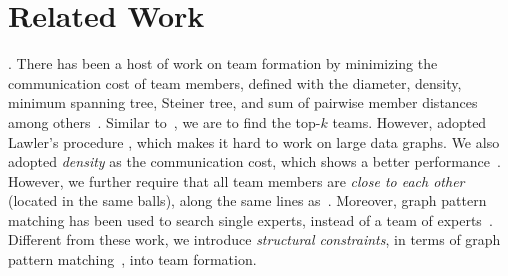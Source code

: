 \section{Related Work}
\label{sec-related}



. There has been a host of work on team formation by minimizing the communication cost of team members, defined with the diameter, density, minimum spanning tree, Steiner tree, and sum of pairwise member distances among others~\cite{Lappas09,Kargar11,ArisLuca12,GajewarS12,realTeamForm13,SamikKVM12,LiTongCao15}.
Similar to~\cite{Kargar11}, we are to find the top-$k$ teams. However,
\cite{Kargar11} adopted Lawler's procedure \cite{Lawler1972}, which makes it hard to work on large data graphs. We also adopted {\em density}  as the communication cost, which shows a better performance~\cite{GajewarS12}. However, we further require that all team members are {\em close to each other} (located in the same balls), along the same lines as~\cite{Lappas09,Kargar11}.  Moreover, graph pattern matching has been used to search single experts, instead of a team of experts~\cite{FanWWXin13}. Different from these work, we introduce {\em structural constraints}, in terms of graph pattern matching~\cite{FanLMTWW10,MaCFHW14}, into team formation.

